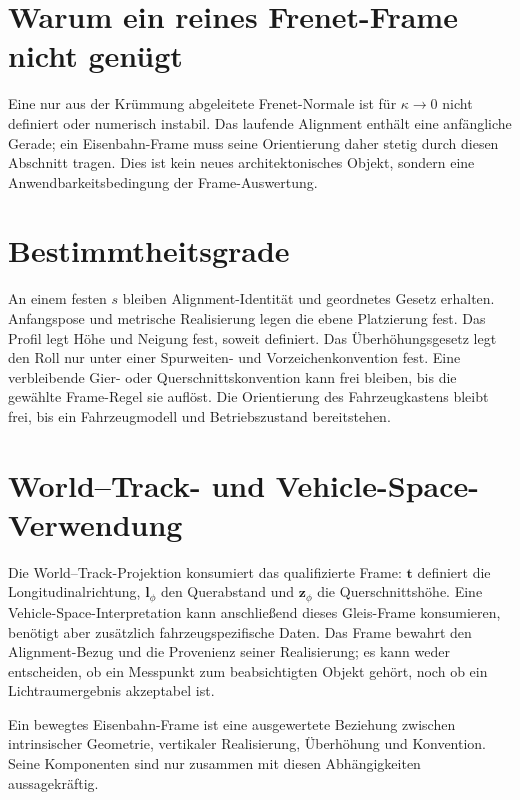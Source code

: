 \section{Warum ein reines Frenet-Frame nicht genügt}

Eine nur aus der Krümmung abgeleitete Frenet-Normale ist für
\(\kappa\rightarrow0\) nicht definiert oder numerisch instabil. Das laufende
Alignment enthält eine anfängliche Gerade; ein Eisenbahn-Frame muss seine
Orientierung daher stetig durch diesen Abschnitt tragen. Dies ist kein neues
architektonisches Objekt, sondern eine Anwendbarkeitsbedingung der
Frame-Auswertung.

\section{Bestimmtheitsgrade}

An einem festen \(s\) bleiben Alignment-Identität und geordnetes Gesetz
erhalten. Anfangspose und metrische Realisierung legen die ebene Platzierung
fest. Das Profil legt Höhe und Neigung fest, soweit definiert. Das
Überhöhungsgesetz legt den Roll nur unter einer Spurweiten- und
Vorzeichenkonvention fest. Eine verbleibende Gier- oder
Querschnittskonvention kann frei bleiben, bis die gewählte Frame-Regel sie
auflöst. Die Orientierung des Fahrzeugkastens bleibt frei, bis ein
Fahrzeugmodell und Betriebszustand bereitstehen.

\section{World--Track- und Vehicle-Space-Verwendung}

Die World--Track-Projektion konsumiert das qualifizierte Frame:
\(\mathbf t\) definiert die Longitudinalrichtung, \(\mathbf l_\phi\) den
Querabstand und \(\mathbf z_\phi\) die Querschnittshöhe. Eine
Vehicle-Space-Interpretation kann anschließend dieses Gleis-Frame konsumieren,
benötigt aber zusätzlich fahrzeugspezifische Daten. Das Frame bewahrt den
Alignment-Bezug und die Provenienz seiner Realisierung; es kann weder
entscheiden, ob ein Messpunkt zum beabsichtigten Objekt gehört, noch ob ein
Lichtraumergebnis akzeptabel ist.

\begin{summary}
Ein bewegtes Eisenbahn-Frame ist eine ausgewertete Beziehung zwischen
intrinsischer Geometrie, vertikaler Realisierung, Überhöhung und Konvention.
Seine Komponenten sind nur zusammen mit diesen Abhängigkeiten aussagekräftig.
\end{summary}
